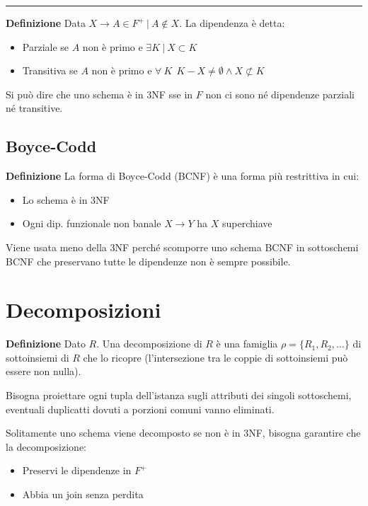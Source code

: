 \documentclass{article}
\begin{document}
\noindent\rule{\textwidth}{0.5pt}\newline

\noindent\textbf{Definizione} Data $X\rightarrow A\in F^+\ |\ A\notin X$. La dipendenza è detta:
\begin{itemize}
    \item Parziale se $A$ non è primo e $\exists K\ |\ X\subset K$
    \item Transitiva se $A$ non è primo e $\forall\ K\ \ K-X\neq\emptyset\wedge X\not\subset K$
\end{itemize}

\noindent Si può dire che uno schema è in 3NF sse in $F$ non ci sono né dipendenze parziali né transitive.\newline

\subsection{Boyce-Codd}

\textbf{Definizione} La forma di Boyce-Codd (BCNF) è una forma più restrittiva in cui:
\begin{itemize}
    \item Lo schema è in 3NF
    \item Ogni dip. funzionale non banale $X\rightarrow Y$ ha $X$ superchiave\newline
\end{itemize}

\noindent Viene usata meno della 3NF perché scomporre uno schema BCNF in sottoschemi BCNF che preservano tutte le dipendenze non è sempre possibile.\newline

\section{Decomposizioni}

\textbf{Definizione} Dato $R$. Una decomposizione di $R$ è una famiglia $\rho=\{R_1,R_2,\ldots\}$ di sottoinsiemi di $R$ che lo ricopre (l'intersezione tra le coppie di sottoinsiemi può essere non nulla).\newline

\noindent Bisogna proiettare ogni tupla dell'istanza sugli attributi dei singoli sottoschemi, eventuali duplicatti dovuti a porzioni comuni vanno eliminati.\newline

\noindent Solitamente uno schema viene decomposto se non è in 3NF, bisogna garantire che la decomposizione:
\begin{itemize}
    \item Preservi le dipendenze in $F^+$
    \item Abbia un join senza perdita\newline
\end{itemize}
\end{document}
